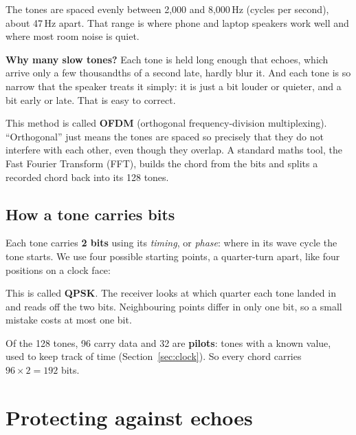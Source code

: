 \documentclass[12pt,a4paper]{article}
\begin{document}
The tones are spaced evenly between 2,000 and 8,000\,Hz (cycles per second),
about 47\,Hz apart. That range is where phone and laptop speakers work well and
where most room noise is quiet.

\begin{idea}
\textbf{Why many slow tones?} Each tone is held long enough that echoes, which
arrive only a few thousandths of a second late, hardly blur it. And each tone
is so narrow that the speaker treats it simply: it is just a bit louder or
quieter, and a bit early or late. That is easy to correct.
\end{idea}

This method is called \textbf{OFDM} (orthogonal frequency-division
multiplexing). ``Orthogonal'' just means the tones are spaced so precisely that
they do not interfere with each other, even though they overlap. A standard
maths tool, the Fast Fourier Transform (FFT), builds the chord from the bits
and splits a recorded chord back into its 128 tones.

\subsection{How a tone carries bits}
Each tone carries \textbf{2 bits} using its \emph{timing}, or \emph{phase}: where
in its wave cycle the tone starts. We use four possible starting points, a
quarter-turn apart, like four positions on a clock face:

\begin{center}
\end{center}

This is called \textbf{QPSK}. The receiver looks at which quarter each tone
landed in and reads off the two bits. Neighbouring points differ in only one
bit, so a small mistake costs at most one bit.

Of the 128 tones, 96 carry data and 32 are \textbf{pilots}: tones with a known
value, used to keep track of time (Section~\ref{sec:clock}). So every chord
carries $96\times2=192$ bits.

\section{Protecting against echoes}
\end{document}
